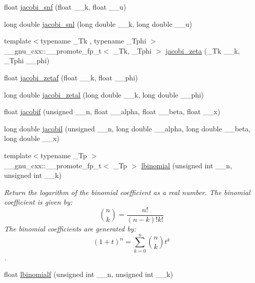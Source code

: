 \begin{DoxyCompactItemize}
\item 
float \hyperlink{group__gnu__math__spec__func_ga5981245b7343da6e21d445bb01fdba9c}{jacobi\+\_\+snf} (float \+\_\+\+\_\+k, float \+\_\+\+\_\+u)
\item 
long double \hyperlink{group__gnu__math__spec__func_ga1c13539e3b051a07b1c28aa8a0aeb1b4}{jacobi\+\_\+snl} (long double \+\_\+\+\_\+k, long double \+\_\+\+\_\+u)
\item 
{\footnotesize template$<$typename \+\_\+\+Tk , typename \+\_\+\+Tphi $>$ }\\\+\_\+\+\_\+gnu\+\_\+cxx\+::\+\_\+\+\_\+promote\+\_\+fp\+\_\+t$<$ \+\_\+\+Tk, \+\_\+\+Tphi $>$ \hyperlink{group__gnu__math__spec__func_gafe1fc209cfe90ceee3b42e077a922045}{jacobi\+\_\+zeta} (\+\_\+\+Tk \+\_\+\+\_\+k, \+\_\+\+Tphi \+\_\+\+\_\+phi)
\item 
float \hyperlink{group__gnu__math__spec__func_gaedb6b352331c67b9dea73660e2045668}{jacobi\+\_\+zetaf} (float \+\_\+\+\_\+k, float \+\_\+\+\_\+phi)
\item 
long double \hyperlink{group__gnu__math__spec__func_ga9db158df9459aa12c840724338753913}{jacobi\+\_\+zetal} (long double \+\_\+\+\_\+k, long double \+\_\+\+\_\+phi)
\item 
float \hyperlink{group__gnu__math__spec__func_ga450db12e06d6993d169afab5b3f6d0b8}{jacobif} (unsigned \+\_\+\+\_\+n, float \+\_\+\+\_\+alpha, float \+\_\+\+\_\+beta, float \+\_\+\+\_\+x)
\item 
long double \hyperlink{group__gnu__math__spec__func_ga2898a5ebf451eaf259ecfcdd171aa72b}{jacobil} (unsigned \+\_\+\+\_\+n, long double \+\_\+\+\_\+alpha, long double \+\_\+\+\_\+beta, long double \+\_\+\+\_\+x)
\item 
{\footnotesize template$<$typename \+\_\+\+Tp $>$ }\\\+\_\+\+\_\+gnu\+\_\+cxx\+::\+\_\+\+\_\+promote\+\_\+fp\+\_\+t$<$ \+\_\+\+Tp $>$ \hyperlink{group__gnu__math__spec__func_ga40d19a09e31feb1ee619e11780113c58}{lbinomial} (unsigned int \+\_\+\+\_\+n, unsigned int \+\_\+\+\_\+k)
\begin{DoxyCompactList}\small\item\em Return the logarithm of the binomial coefficient as a real number. The binomial coefficient is given by\+: \[ \binom{n}{k} = \frac{n!}{(n-k)! k!} \] The binomial coefficients are generated by\+: \[ \left(1 + t\right)^n = \sum_{k=0}^n \binom{n}{k} t^k \]. \end{DoxyCompactList}\item 
float \hyperlink{group__gnu__math__spec__func_ga2fe55bab4211fb240e1eb01341914129}{lbinomialf} (unsigned int \+\_\+\+\_\+n, unsigned int \+\_\+\+\_\+k)

\end{DoxyCompactItemize}
